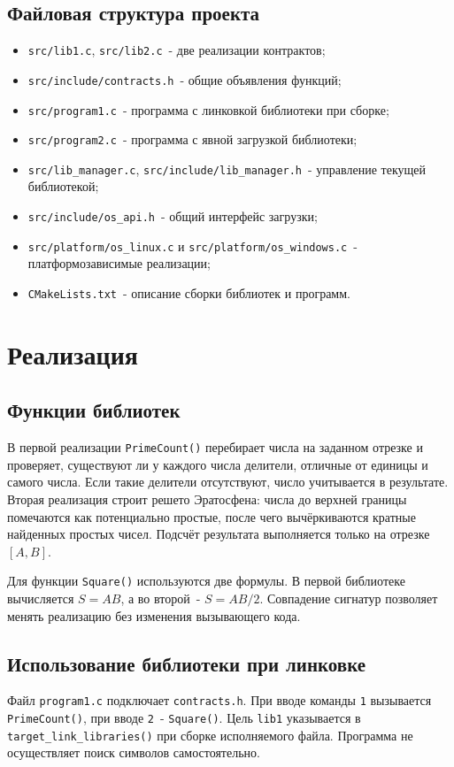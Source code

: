 \documentclass[12pt,a4paper]{article}
\begin{document}
\subsection{Файловая структура проекта}
\begin{itemize}
  \item \texttt{src/lib1.c}, \texttt{src/lib2.c}~- две реализации контрактов;
  \item \texttt{src/include/contracts.h}~- общие объявления функций;
  \item \texttt{src/program1.c}~- программа с линковкой библиотеки при сборке;
  \item \texttt{src/program2.c}~- программа с явной загрузкой библиотеки;
  \item \texttt{src/lib\_manager.c}, \texttt{src/include/lib\_manager.h}~- управление текущей библиотекой;
  \item \texttt{src/include/os\_api.h}~- общий интерфейс загрузки;
  \item \texttt{src/platform/os\_linux.c} и \texttt{src/platform/os\_windows.c}~- платформозависимые реализации;
  \item \texttt{CMakeLists.txt}~- описание сборки библиотек и программ.
\end{itemize}

\section{Реализация}
\subsection{Функции библиотек}
В первой реализации \texttt{PrimeCount()} перебирает числа на заданном отрезке и проверяет, существуют ли у каждого числа делители, отличные от единицы и самого числа. Если такие делители отсутствуют, число учитывается в результате. Вторая реализация строит решето Эратосфена: числа до верхней границы помечаются как потенциально простые, после чего вычёркиваются кратные найденных простых чисел. Подсчёт результата выполняется только на отрезке $[A,B]$.

Для функции \texttt{Square()} используются две формулы. В первой библиотеке вычисляется $S=AB$, а во второй~- $S=AB/2$. Совпадение сигнатур позволяет менять реализацию без изменения вызывающего кода.

\subsection{Использование библиотеки при линковке}
Файл \texttt{program1.c} подключает \texttt{contracts.h}. При вводе команды \texttt{1} вызывается \texttt{PrimeCount()}, при вводе \texttt{2}~- \texttt{Square()}. Цель \texttt{lib1} указывается в \texttt{target\_link\_libraries()} при сборке исполняемого файла. Программа не осуществляет поиск символов самостоятельно.
\end{document}
